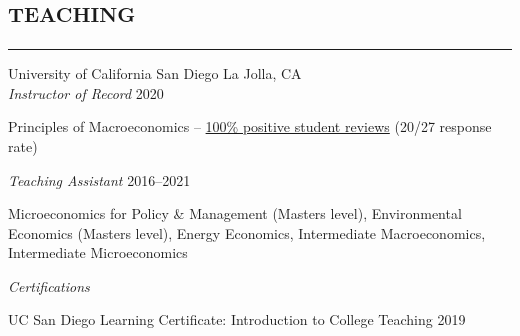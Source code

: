 \documentclass[letterpaper]{article}
\renewenvironment{itemize}{
  \begin{list}{}{
    \setlength{\leftmargin}{1em}
      \setlength{\itemsep}{0.25em}
    \setlength{\parskip}{0pt}
    \setlength{\parsep}{0pt} 
  }
}{
  \end{list}
}
\begin{document}
\section*{\textsc{\textbf{teaching}}}
\hrule 
\vspace{.2cm}




University of California San Diego \hfill La Jolla, CA\\ 
\emph{Instructor of Record} \hfill 2020 

\begin{itemize}
    \item Principles of Macroeconomics -- \href{https://www.dropbox.com/s/5pvyrr303b5ceyc/Howden_Wesley_CAPE_-_ECON_3_-_Principles_of_Macroeconomics_%5BA01%5D_%28Howden_Wesley_Dixon%29_-_S120A.pdf?dl=0}{{100\% positive student reviews}} (20/27 response rate)
\end{itemize}

\emph{Teaching Assistant}  \hfill 2016--2021

\begin{itemize}
    \item Microeconomics for Policy \& Management (Masters level), Environmental Economics (Masters level), Energy Economics, Intermediate Macroeconomics, Intermediate Microeconomics
\end{itemize}

\emph{Certifications} 
\begin{itemize}
    \item UC San Diego Learning Certificate: Introduction to College Teaching \hfill{2019}
\end{itemize}
\end{document}
